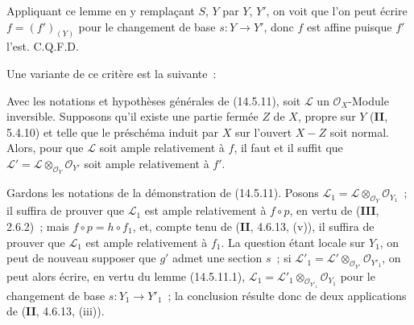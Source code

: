 Appliquant ce lemme en y remplaçant $S$, $Y$ par $Y$, $Y'$, on voit que l'on peut
écrire $f=(f')_{(Y)}$ pour le changement de base $s:Y\to Y'$, donc $f$ est affine
puisque $f'$ l'est. C.Q.F.D.

Une variante de ce critère est la suivante~:

\begin{corollary}[14.5.12]
\label{IV.14.5.12-fr}
Avec les notations et hypothèses générales de (14.5.11), soit $\mathcal L$ un
$\mathcal O_X$-Module inversible. Supposons qu'il existe une partie fermée $Z$ de
$X$, propre sur $Y$ (\textbf{II}, 5.4.10) et telle que le préschéma induit par $X$
sur l'ouvert $X-Z$ soit normal. Alors, pour que $\mathcal L$ soit ample relativement
à $f$, il faut et il suffit que
$\mathcal L'=\mathcal L\otimes_{\mathcal O_Y}\mathcal O_{Y'}$ soit ample
relativement à $f'$.
\end{corollary}

Gardons les notations de la démonstration de (14.5.11). Posons
$\mathcal L_1=\mathcal L\otimes_{\mathcal O_Y}\mathcal O_{Y_1}$~; il suffira de
prouver que $\mathcal L_1$ est ample relativement à $f\circ p$, en vertu de
(\textbf{III}, 2.6.2)~; mais $f\circ p=h\circ f_1$, et, compte tenu de
(\textbf{II}, 4.6.13, (v)), il suffira de prouver que $\mathcal L_1$ est ample
relativement à $f_1$. La question étant locale sur $Y_1$, on peut de nouveau
supposer que $g'$ admet une section $s$~; si
$\mathcal L'_1=\mathcal L'\otimes_{\mathcal O_{Y'}}\mathcal O_{Y'_1}$, on peut
alors écrire, en vertu du lemme (14.5.11.1),
$\mathcal L_1=\mathcal L'_1\otimes_{\mathcal O_{Y'_1}}\mathcal O_{Y_1}$ pour le
changement de base $s:Y_1\to Y'_1$~; la conclusion résulte donc de deux
applications de (\textbf{II}, 4.6.13, (iii)).

